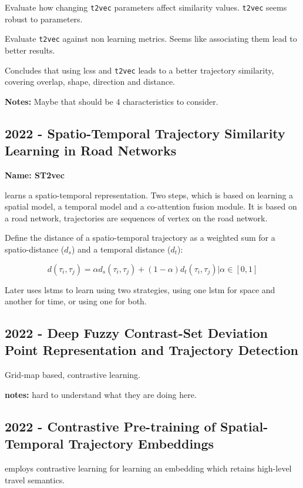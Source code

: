 Evaluate how changing \texttt{t2vec} parameters affect similarity values. \texttt{t2vec} seems robust to parameters.

Evaluate \texttt{t2vec} against non learning metrics. Seems like associating them lead to better results.


Concludes that using \gls{lcss} and \texttt{t2vec} leads to a better trajectory similarity, covering overlap, shape, direction and distance.

\textbf{Notes:} Maybe that should be $4$ characteristics to consider.   


\subsection*{2022 - Spatio-Temporal Trajectory Similarity Learning in Road Networks}

\textbf{Name: ST2vec}

\cite{fang2022spatio} learns a spatio-temporal representation. Two steps, which is based on learning a spatial model, a temporal model and a co-attention fusion module. It is based on a road network, trajectories are sequences of vertex on the road network.

Define the distance of a spatio-temporal trajectory as a weighted sum for a spatio-distance ($d_s$) and a temporal distance ($d_t$):

$$d(\tau_i, \tau_j) = \alpha d_s(\tau_i, \tau_j) + (1-\alpha)d_t(\tau_i, \tau_j) | \alpha \in [0,1]$$

Later uses \glspl{lstm} to learn using two strategies, using one \gls{lstm} for space and another for time, or using one for both.

\subsection*{2022 - Deep Fuzzy Contrast-Set Deviation Point Representation and Trajectory Detection}
\cite{ahmed2022deep} Grid-map based, contrastive learning. 

\textbf{notes:} hard to understand what they are doing here.

\subsection*{2022 - Contrastive Pre-training of Spatial-Temporal Trajectory Embeddings}
\cite{lin2022contrastive} employs contrastive learning for learning an embedding which retains high-level travel semantics.

